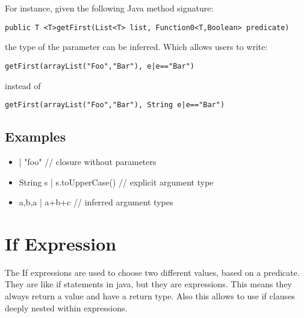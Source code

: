 \documentclass[a4paper,10pt]{scrreprt}
\newlength{\itemindentlen}
\begin{document}
For instance, given the following Java method signature:
\begin{lstlisting}
public T <T>getFirst(List<T> list, Function0<T,Boolean> predicate) 

\end{lstlisting}
 

the type of the parameter can be inferred. Which allows users to write:
\begin{lstlisting}
getFirst(arrayList("Foo","Bar"), e|e=="Bar")

\end{lstlisting}

instead of 
\begin{lstlisting}
getFirst(arrayList("Foo","Bar"), String e|e=="Bar")

\end{lstlisting}





\subsection{Examples}


\setlength{\itemindentlen}{\textwidth}
\begin{itemize}
\addtolength{\itemindentlen}{-2em}

\item \begin{minipage}[t]{\itemindentlen}
| "foo"   // closure without parameters
\end{minipage}

\item \begin{minipage}[t]{\itemindentlen}
String s | s.toUpperCase() // explicit argument type
\end{minipage}

\item \begin{minipage}[t]{\itemindentlen}
a,b,a | a+b+c  // inferred argument types
\end{minipage}

\end{itemize}
\addtolength{\itemindentlen}{2em}







\section{If Expression}
\label{IfExpression}
The If expressions are used to choose two different values, based on a predicate.
They are like if statements in java, but they are expressions. This means they always return a value and have a return type. Also this allows
to use if clauses deeply nested within expressions. 
\end{document}
